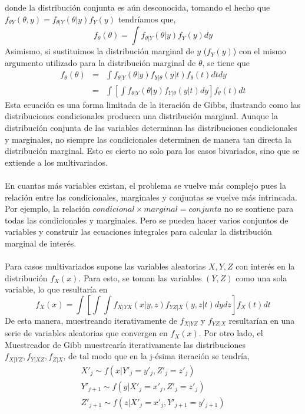 donde la distribuci\'on conjunta es a\'un desconocida, tomando el hecho que $f_{\theta Y}(\theta,y)=f_{\theta|Y}(\theta|y)f_Y(y)$ tendr\'iamos que,\\
\[f_\theta(\theta)=\int f_{\theta|Y}(\theta|y)f_Y(y) dy\]
Asimismo, si sustituimos la distribuci\'on marginal de $y$ ($f_Y(y)$) con el mismo argumento utilizado para la distribuci\'on marginal de $\theta$, se tiene que
\begin{eqnarray*}
f_\theta(\theta) &=& \int f_{\theta|Y}(\theta|y) f_{Y|\theta}(y|t) f_\theta(t)dt dy\\
       &=& \int [ \int  f_{\theta|Y}(\theta|y)f_{Y|\theta}(y|t) dy]  f_\theta(t) dt
\end{eqnarray*}
Esta ecuaci\'on es una forma limitada de la iteraci\'on de Gibbs, ilustrando como las distribuciones condicionales producen una distribuci\'on marginal. Aunque la distribuci\'on conjunta de las variables determinan las distribuciones condicionales y marginales, no siempre las condicionales determinen de manera tan directa la distribuci\'on marginal. Esto es cierto no solo para los casos bivariados, sino que se extiende a los multivariados.\\
\\
En cuantas m\'as variables existan, el problema se vuelve m\'as complejo pues la relaci\'on entre las condicionales, marginales y conjuntas se vuelve m\'as intrincada. Por ejemplo, la relaci\'on $condicional \times marginal = conjunta$ no se sontiene para todas las condicionales y marginales. Pero se pueden hacer varios conjuntos de variables y construir las ecuaciones integrales para calcular la distribuci\'on marginal de inter\'es.\\
\\
Para casos multivariados \cite{casella1992explaining} supone las variables aleatorias $X,Y,Z$ con inter\'es en la distribuci\'on $f_X(x)$. Para esto, se toman las variables $(Y,Z)$ como una sola variable, lo que resultar\'ia en\\
\[f_X(x)= \int [ \int \int f_{X|YX}(x|y,z)f_{YZ|X}(y,z|t)dy dz] f_X(t) dt\]
De esta manera, muestreando iterativamente de $f_{X|YZ}$ y $f_{YZ|X}$ resultar\'ian en una serie de variables aleatorias que convergen en $f_X(x)$. Por otro lado, el Muestreador de Gibb muestrear\'ia iterativamente las distribuciones $f_{X|YZ}, f_{Y|XZ}, f_{Z|X}$, de tal modo que en la j-\'esima iteraci\'on se tendr\'ia,\\
\begin{align*}
X'_j \sim f(x|Y'_j = y'_j, Z'_j=z'_j)\\
Y'_{j+1} \sim f(y|X'_j=x'_j, Z'_j=z'_j)\\
Z'_{j+1} \sim f(z|X'_j=x'_j, Y'_{j+1}=y'_{j+1})
\end{align*}
